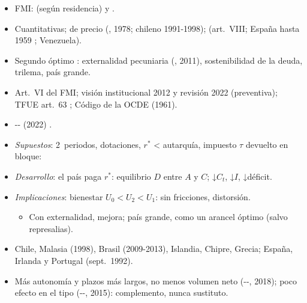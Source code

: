 \documentclass{article}
\begin{document}
\begin{columnas}
\begin{itemize}
\item FMI:  (según residencia) y  .
\item Cuantitativas; de precio (, 1978;  chileno 1991-1998);  (art.\ VIII; España hasta 1959 ; Venezuela).
\end{itemize}
\begin{itemize}
\item Segundo óptimo : externalidad pecuniaria (, 2011), sostenibilidad de la deuda, trilema, país grande.
\item Art.\ VI del FMI; visión institucional 2012 y revisión 2022 (preventiva); TFUE art.\ 63 ; Código de la OCDE (1961).
\end{itemize}
\begin{itemize}
\item {}-- (2022) .
\item \emph{Supuestos}: 2~periodos, dotaciones, $r^*$ < autarquía, impuesto $\tau$ devuelto en bloque:
\item \emph{Desarrollo}: el país paga $r^*$: equilibrio $D$ entre $A$ y $C$; ↓$C_t$, ↓$I$, ↓déficit.
\item \emph{Implicaciones}: bienestar $U_0<U_2<U_1$: sin fricciones, distorsión.
  \begin{itemize}
  \item Con externalidad, mejora; país grande, como un arancel óptimo (salvo represalias).
  \end{itemize}
\end{itemize}
\begin{itemize}
\item Chile, Malasia (1998), Brasil (2009-2013), Islandia, Chipre, Grecia; España, Irlanda y Portugal (sept.\ 1992).
\item Más autonomía y plazos más largos, no menos volumen neto (--, 2018); poco efecto en el tipo (--, 2015): complemento, nunca sustituto.
\end{itemize}


\end{columnas}
\end{document}
